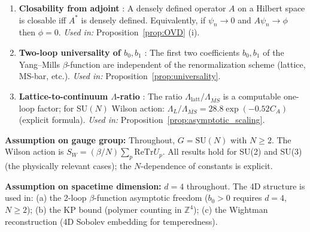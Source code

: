 \documentclass[11pt,a4paper]{amsart}
\theoremstyle{definition}
\newcommand{\SU}{\mathrm{SU}}
\newcommand{\Z}{\mathbb{Z}}
\newcommand{\re}{\mathrm{Re}}
\newcommand{\Tr}{\mathrm{Tr}}
\begin{document}
\begin{enumerate}
\item \textbf{Closability from adjoint} \cite[Thm.~VIII.1]{Reed75}:
A densely defined operator $A$ on a Hilbert space is closable iff $A^*$ is
densely defined.  Equivalently, if $\psi_n \to 0$ and $A\psi_n \to \phi$
then $\phi = 0$.
\textit{Used in:} Proposition~\ref{prop:OVD} (i).

\item \textbf{Two-loop universality of $b_0, b_1$} \cite{MukhiBook}:
The first two coefficients $b_0, b_1$ of the Yang--Mills $\beta$-function are
independent of the renormalization scheme (lattice, MS-bar, etc.).
\textit{Used in:} Proposition~\ref{prop:universality}.

\item \textbf{Lattice-to-continuum $\Lambda$-ratio} \cite{HaagMack}:
The ratio $\Lambda_\mathrm{latt}/\Lambda_{\overline{MS}}$ is a computable
one-loop factor; for SU$(N)$ Wilson action: $\Lambda_L/\Lambda_{\overline{MS}}
= 28.8 \exp(-0.52 C_A)$ (explicit formula).
\textit{Used in:} Proposition~\ref{prop:asymptotic_scaling}.
\end{enumerate}

\textbf{Assumption on gauge group:}
Throughout, $G = \SU(N)$ with $N \ge 2$.  The Wilson action is
$S_W = (\beta/N)\sum_p \re\Tr U_p$.  All results hold for SU(2) and SU(3)
(the physically relevant cases); the $N$-dependence of constants is explicit.

\textbf{Assumption on spacetime dimension:}
$d = 4$ throughout.  The 4D structure is used in: (a) the 2-loop $\beta$-function
asymptotic freedom ($b_0 > 0$ requires $d=4$, $N \ge 2$); (b) the KP bound
(polymer counting in $\Z^4$); (c) the Wightman reconstruction (4D Sobolev
embedding for temperedness).
\end{document}
